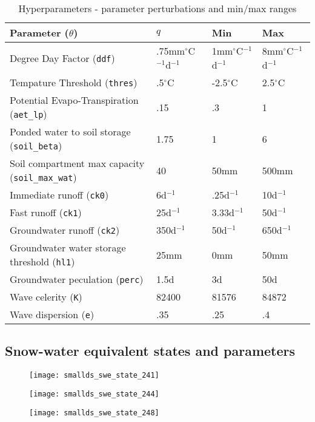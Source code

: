 \begin{table}[]
\caption{Hyperparameters - parameter perturbations and min/max ranges} 
\begin{tabular}{llll}
Parameter ($\theta$) & $q$ & Min & Max \\ \hline
Degree Day Factor (\texttt{ddf})                 & .75mm$^\circ$C$^{-1}$d$^{-1}$ & 1mm$^\circ$C$^{-1}$d$^{-1}$ & 8mm$^\circ$C$^{-1}$d$^{-1}$ \\
Tempature Threshold (\texttt{thres})                & .5$^\circ$C & -2.5$^\circ$C & 2.5$^\circ$C \\
Potential Evapo-Transpiration (\texttt{aet\_lp})              & .15 & .3 & 1\\
Ponded water to soil storage (\texttt{soil\_beta})          & 1.75 & 1 & 6 \\
Soil compartment max capacity (\texttt{soil\_max\_wat})       & 40 & 50mm & 500mm \\
Immediate runoff (\texttt{ck0})       & 6d$^{-1}$ & .25d$^{-1}$ & 10d$^{-1}$ \\
Fast runoff (\texttt{ck1})      & 25d$^{-1}$ & 3.33d$^{-1}$ & 50d$^{-1}$\\
Groundwater runoff (\texttt{ck2})       & 350d$^{-1}$ & 50d$^{-1}$ & 650d$^{-1}$ \\
Groundwater water storage threshold (\texttt{hl1})       & 25mm & 0mm & 50mm \\
Groundwater peculation (\texttt{perc})       & 1.5d & 3d & 50d \\
Wave celerity (\texttt{K})         & 82400 & 81576 & 84872 \\
Wave dispersion (\texttt{e})       & .35 & .25 & .4 \\
\end{tabular}
\label{tab:t_param_min_max_initial}
\end{table}

\subsection{Snow-water equivalent states and parameters}

\begin{figure}
\centering
\begin{minipage}{.33\textwidth}
  \centering
  \texttt{[image: smallds\_swe\_state\_241]}
  \label{fig:241swe}
\end{minipage}%
\begin{minipage}{.33\textwidth}
  \centering
  \texttt{[image: smallds\_swe\_state\_244]}
  \label{fig:244swe}
\end{minipage}
\begin{minipage}{.33\textwidth}
  \centering
  \texttt{[image: smallds\_swe\_state\_248]}
  \label{fig:248swe}
\end{minipage}
\label{fig:swe_state_small}
\end{figure}


